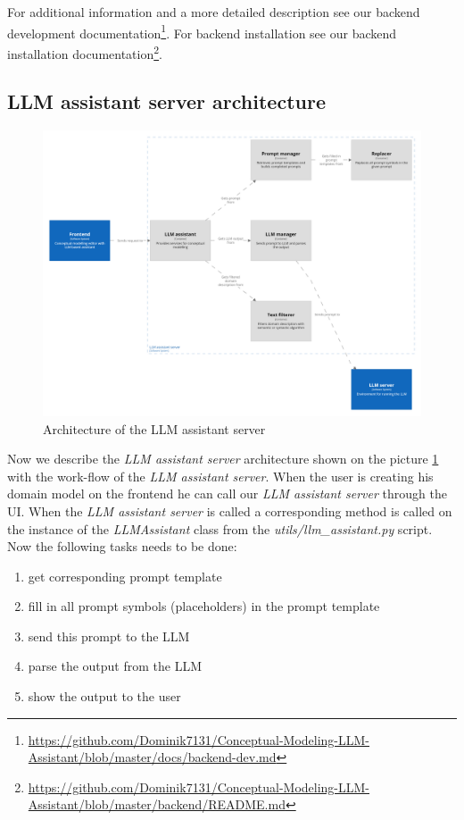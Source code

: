 \noindent{}For additional information and a more detailed description see our backend development documentation\footnote{\url{https://github.com/Dominik7131/Conceptual-Modeling-LLM-Assistant/blob/master/docs/backend-dev.md}}. For backend installation see our backend installation documentation\footnote{\url{https://github.com/Dominik7131/Conceptual-Modeling-LLM-Assistant/blob/master/backend/README.md}}.


\subsection{LLM assistant server architecture}

\begin{figure}[!h]
    \includegraphics[scale=0.14]{../docs/images/architecture/llm-assistant-server-containers.png}
    \caption{\centering Architecture of the LLM assistant server}
    \label{fig:llm_assistant_server_containers}
\end{figure}

Now we describe the \emph{LLM assistant server} architecture shown on the picture \ref{fig:llm_assistant_server_containers} with the work-flow of the \emph{LLM assistant server}. When the user is creating his domain model on the frontend he can call our \emph{LLM assistant server} through the UI. When the \emph{LLM assistant server} is called a corresponding method is called on the instance of the \textit{LLMAssistant} class from the \textit{utils/llm\_assistant.py} script. Now the following tasks needs to be done:

\begin{enumerate}
\item get corresponding prompt template
\item fill in all prompt symbols (placeholders) in the prompt template
\item send this prompt to the LLM
\item parse the output from the LLM
\item show the output to the user
\end{enumerate}


